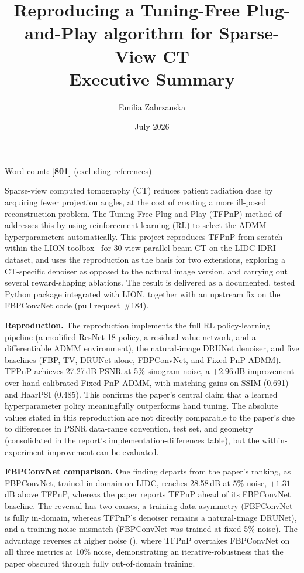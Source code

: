 \documentclass[11pt,a4paper]{article}
\title{\vspace{-2cm}Reproducing a Tuning-Free Plug-and-Play algorithm for Sparse-View CT \\[0.5cm]
{\large Executive Summary}}
\author{Emilia Zabrzanska}
\date{July 2026}
\begin{document}
\maketitle
 
\begin{center}
{\small Word count: \textbf{[801]} (excluding references)}
\end{center}
\vspace{0.3cm}

Sparse-view computed tomography (CT) reduces patient radiation dose by acquiring fewer projection angles, at the cost of creating a more ill-posed reconstruction problem. The Tuning-Free Plug-and-Play (TFPnP) method of~\citet{Wei2022TFPnP} addresses this by using reinforcement learning (RL) to select the ADMM hyperparameters automatically. This project reproduces TFPnP from scratch within the LION toolbox~\citep{Biguri2024LION} for 30-view parallel-beam CT on the LIDC-IDRI dataset, and uses the reproduction as the basis for two extensions, exploring a CT-specific denoiser as opposed to the natural image version, and carrying out several reward-shaping ablations. The result is delivered as a documented, tested Python package integrated with LION, together with an upstream fix on the FBPConvNet code (pull request~\#184).

\textbf{Reproduction.} The reproduction implements the full RL policy-learning pipeline (a modified ResNet-18 policy, a residual value network, and a differentiable ADMM environment), the natural-image DRUNet denoiser, and five baselines (FBP, TV, DRUNet alone, FBPConvNet, and Fixed PnP-ADMM). TFPnP achieves 27.27\,dB PSNR at 5\% sinogram noise, a $+2.96$\,dB improvement over hand-calibrated Fixed PnP-ADMM, with matching gains on SSIM (0.691) and HaarPSI (0.485). This confirms the paper's central claim that a learned hyperparameter policy meaningfully outperforms hand tuning. The absolute values stated in this reproduction are not directly comparable to the paper's due to differences in PSNR data-range convention, test set, and geometry (consolidated in the report's implementation-differences table), but the within-experiment improvement can be evaluated.

\textbf{FBPConvNet comparison.} One finding departs from the paper's ranking, as FBPConvNet, trained in-domain on LIDC, reaches 28.58\,dB at 5\% noise, $+1.31$\,dB above TFPnP, whereas the paper reports TFPnP ahead of its FBPConvNet baseline. The reversal has two causes, a training-data asymmetry (FBPConvNet is fully in-domain, whereas TFPnP's denoiser remains a natural-image DRUNet), and a training-noise mismatch (FBPConvNet was trained at fixed 5\% noise). The advantage reverses at higher noise (), where TFPnP overtakes FBPConvNet on all three metrics at 10\% noise, demonstrating an iterative-robustness that the paper obscured through fully out-of-domain training.
\end{document}
